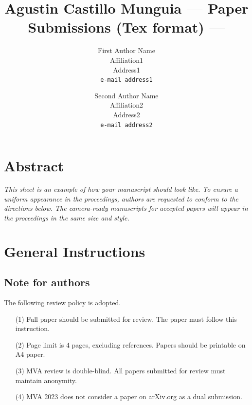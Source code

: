 \documentclass{mva_style}
\begin{document}
\title{Agustin Castillo Munguia --- Paper Submissions (Tex format) ---}

\author{
  First Author Name\\
  Affiliation1\\
  Address1\\
  {\tt e-mail address1}\\
  \and
  Second Author Name\\
  Affiliation2\\
  Address2\\
  {\tt e-mail address2}\\
}

\maketitle


\section*{\centering Abstract}
\textit{
  This sheet is an example of how your manuscript should look like. 
  To ensure a uniform appearance in the proceedings, 
  authors are requested to conform to the directions below. 
  The camera-ready manuscripts for accepted papers 
  will appear in the proceedings in the same size and style.
}

\section{General Instructions}
\subsection{Note for authors}

The following review policy is adopted.

\begin{itemize}
  \item[(1)] Full paper should be submitted for review. 
    The paper must follow this instruction.
  \item[(2)] Page limit is 4 pages, excluding
    references. Papers should be
    printable on A4 paper.
  \item[(3)] MVA review is double-blind. 
    All papers submitted for review must maintain anonymity.
  \item[(4)] MVA 2023 does not consider a paper on arXiv.org as a dual submission.
\end{itemize}
\end{document}
